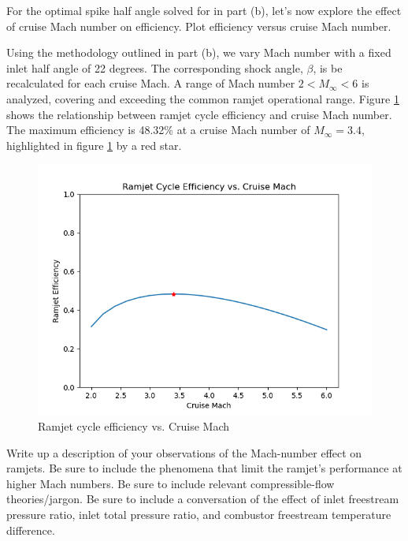 \documentclass[../main.tex]{subfiles}
\begin{document}

For the optimal spike half angle solved for in part (b), let's now explore the effect of cruise Mach number on efficiency. 
Plot efficiency versus cruise Mach number.

\solution{}
Using the methodology outlined in part (b), we vary Mach number with a fixed inlet half angle of 22 degrees.
The corresponding shock angle, \(\beta\), is be recalculated for each cruise Mach.
A range of Mach number \(2<M_\infty<6\) is analyzed, covering and exceeding the common ramjet operational range.
Figure \ref{eta_vs_mach} shows the relationship between ramjet cycle efficiency and cruise Mach number.
The maximum efficiency is 48.32\% at a cruise Mach number of \(M_\infty=3.4\), highlighted in figure \ref{eta_vs_mach} by a red star.

\begin{figure}[h!]
    \centering
    \includegraphics[]{../../images/problem_2/eta_vs_mach.png}
    \caption{Ramjet cycle efficiency vs. Cruise Mach}
    \label{eta_vs_mach}
\end{figure}


Write up a description of your observations of the Mach-number effect on ramjets. 
Be sure to include the phenomena that limit the ramjet's performance at higher Mach numbers.
Be sure to include relevant compressible-flow theories/jargon. 
Be sure to include a conversation of the effect of inlet freestream pressure ratio, inlet total pressure ratio, and combustor freestream temperature difference.
\end{document}

